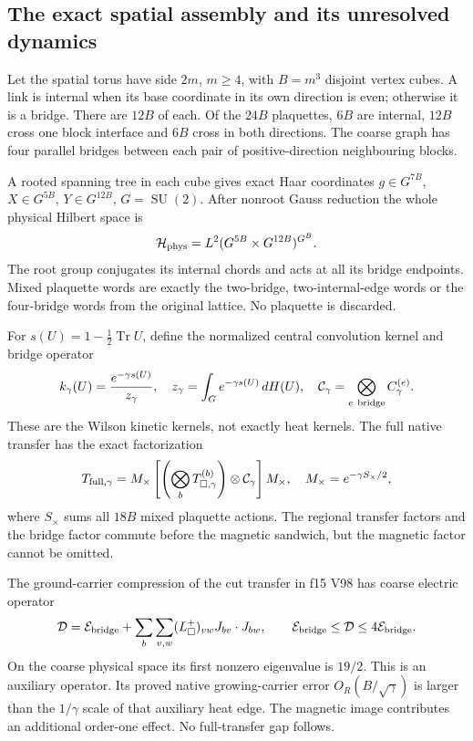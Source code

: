 \documentclass[11pt,oneside]{article}
\DeclareMathOperator{\SU}{SU}
\DeclareMathOperator{\Tr}{Tr}
\begin{document}
\subsection{The exact spatial assembly and its unresolved dynamics}

Let the spatial torus have side \(2m\), \(m\ge4\), with
\(B=m^3\) disjoint vertex cubes. A link is internal when its base
coordinate in its own direction is even; otherwise it is a bridge.
There are \(12B\) of each. Of the \(24B\) plaquettes, \(6B\)
are internal, \(12B\) cross one block interface and \(6B\) cross
in both directions. The coarse graph has four parallel bridges
between each pair of positive-direction neighbouring blocks.

A rooted spanning tree in each cube gives exact Haar coordinates
\(g\in G^{7B}\), \(X\in G^{5B}\), \(Y\in G^{12B}\), \(G=\SU(2)\).
After nonroot Gauss reduction the whole physical Hilbert space is
\begin{equation}
 \mathcal H_{\rm phys}
       =L^2(G^{5B}\times G^{12B})^{G^B}.
 \label{f16v1:physical}
\end{equation}
The root group conjugates its internal chords and acts at all its
bridge endpoints. Mixed plaquette words are exactly the two-bridge,
two-internal-edge words or the four-bridge words from the original
lattice. No plaquette is discarded.

For \(s(U)=1-\frac12\Tr U\), define the normalized central convolution
kernel and bridge operator
\begin{equation}
 k_\gamma(U)=\frac{e^{-\gamma s(U)}}{z_\gamma},\quad
 z_\gamma=\int_Ge^{-\gamma s(U)}\,dH(U),\quad
 \mathcal C_\gamma=\bigotimes_{e\ {\rm bridge}} C_\gamma^{(e)}.
 \label{f16v1:kinetic}
\end{equation}
These are the Wilson kinetic kernels, not exactly heat kernels.
The full native transfer has the exact factorization
\begin{equation}
 T_{\rm full,\gamma}
 =M_\times\left[
       \left(\bigotimes_b T_{\Box,\gamma}^{(b)}\right)
                       \otimes\mathcal C_\gamma\right]M_\times,
 \quad M_\times=e^{-\gamma S_\times/2},
 \label{f16v1:full}
\end{equation}
where \(S_\times\) sums all \(18B\) mixed plaquette actions.
The regional transfer factors and the bridge factor commute before
the magnetic sandwich, but the magnetic factor cannot be omitted.

The ground-carrier compression of the cut transfer in f15 V98
has coarse electric operator
\[
 \mathcal D=\mathcal E_{\rm bridge}
       +\sum_b\sum_{v,w}(L_\Box^+)_{vw}J_{bv}\cdot J_{bw},
 \qquad \mathcal E_{\rm bridge}\le\mathcal D
                         \le4\mathcal E_{\rm bridge}.
\]
On the coarse physical space its first nonzero eigenvalue is \(19/2\).
This is an auxiliary operator. Its proved native growing-carrier
error \(O_R(B/\sqrt\gamma)\) is larger than the \(1/\gamma\)
scale of that auxiliary heat edge. The magnetic image contributes
an additional order-one effect. No full-transfer gap follows.
\end{document}
